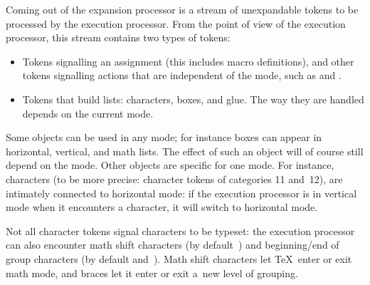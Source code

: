\documentclass{book}
\begin{document}
Coming out of the expansion processor is a stream of
unexpandable tokens to be processed by
the execution processor. 
\relax From the point of view of the execution processor, this
stream contains two types of tokens:
\begin{itemize}
\item Tokens signalling an assignment (this includes
      macro definitions), and
      other tokens signalling actions
      that are independent of the mode, such
      as  and .
\item Tokens that build lists:
      characters, boxes, and glue. The way they are handled
      depends on the current mode.
\end{itemize}

Some objects can be used in any mode; for instance boxes
can appear in horizontal, vertical, and math lists.
The effect of such an object will of course still depend on the mode.
Other objects are  specific for one mode.
For instance, characters (to be more precise:
character tokens of categories 11 and~12), 
are intimately connected to horizontal mode:
if the execution processor 
is in vertical mode when it encounters a character, it will
switch to horizontal mode.

Not all character tokens signal characters to be typeset:
the execution processor can also encounter math shift
characters (by default~) and beginning/end of group
characters (by default  and~).
Math shift characters let \TeX\ enter or exit
math mode, and braces let it enter or exit a~new level of
grouping.
\end{document}
